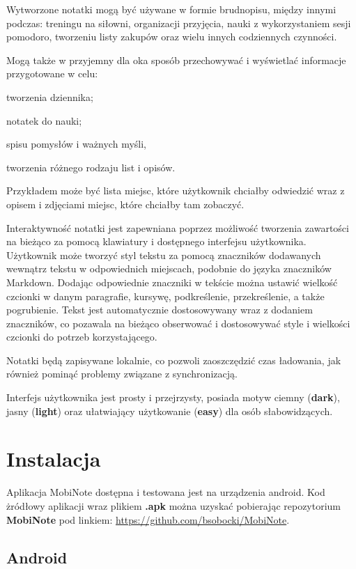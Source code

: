 \documentclass[shortabstract]{iithesis}
\begin{document}
Wytworzone notatki mogą być używane w formie brudnopisu, między innymi podczas: treningu na siłowni, organizacji przyjęcia, nauki z wykorzystaniem sesji pomodoro, tworzeniu listy zakupów oraz wielu innych codziennych czynności.

Mogą także w przyjemny dla oka sposób przechowywać i wyświetlać informacje przygotowane w celu:
\begin{compactitem}
 \item tworzenia dziennika;
 \item notatek do nauki;
 \item spisu pomysłów i ważnych myśli,
 \item tworzenia różnego rodzaju list i opisów.
\end{compactitem}
 Przykładem może być lista miejsc, które użytkownik chciałby odwiedzić wraz z opisem i zdjęciami miejsc, które chciałby tam zobaczyć.

Interaktywność notatki jest zapewniana poprzez możliwość tworzenia zawartości na bieżąco za pomocą klawiatury i dostępnego interfejsu użytkownika.
Użytkownik może tworzyć styl tekstu za pomocą znaczników dodawanych wewnątrz tekstu w odpowiednich miejscach, podobnie do języka znaczników Markdown.
Dodając odpowiednie znaczniki w tekście można ustawić wielkość czcionki w danym paragrafie, kursywę, podkreślenie, przekreślenie, a także pogrubienie.
Tekst jest automatycznie dostosowywany wraz z dodaniem znaczników, co pozawala na bieżąco obserwować i dostosowywać style i wielkości czcionki do potrzeb korzystającego.

Notatki będą zapisywane lokalnie, co pozwoli zaoszczędzić czas ładowania, jak również pominąć problemy związane z synchronizacją.

Interfejs użytkownika jest prosty i przejrzysty, posiada motyw ciemny (\textbf{dark}), jasny (\textbf{light}) oraz ułatwiający użytkowanie (\textbf{easy}) dla osób słabowidzących.

\chapter{Instalacja}

Aplikacja MobiNote dostępna i testowana jest na urządzenia android.
Kod żródłowy aplikacji wraz plikiem \textbf{.apk} można uzyskać pobierając repozytorium \textbf{MobiNote} pod linkiem:
\url{https://github.com/bsobocki/MobiNote}.

\section{Android}
\end{document}

